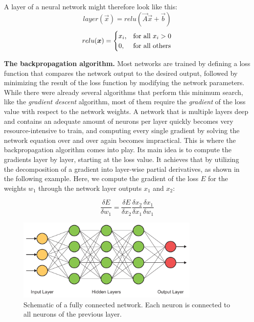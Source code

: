 A layer of a neural network might therefore look like this:
\begin{equation}\label{eq:networklayer}
layer(\vec{x}) = relu(\vec{A} \vec{x} + \vec{b})
\end{equation}
\begin{equation}
relu(\vec{x}) = \begin{cases}x_i$,$ & $for all $ x_i > 0\\0$,$ & $for all others$\end{cases}
\end{equation}


\textbf{The backpropagation algorithm.} Most networks are trained by defining a loss function that compares the network output to the desired output, followed by minimizing the result of the loss function by modifying the network parameters. While there were already several algorithms that perform this minimum search, like the \emph{gradient descent} algorithm, most of them require the \emph{gradient} of the loss value with respect to the network weights. A network that is multiple layers deep and contains an adequate amount of neurons per layer quickly becomes very resource-intensive to train, and computing every single gradient by solving the network equation over and over again becomes impractical. This is where the backpropagation algorithm comes into play. Its main idea is to compute the gradients layer by layer, starting at the loss value. It achieves that by utilizing the decomposition of a gradient into layer-wise partial derivatives, as shown in the following example. Here, we compute the gradient of the loss $E$ for the weights $w_1$ through the network layer outputs $x_1$ and $x_2$:

\begin{equation}
\frac{\delta E}{\delta w_1} = \frac{\delta E}{\delta x_2}\frac{\delta x_2}{\delta x_1}\frac{\delta x_1}{\delta w_1}
\end{equation}

\begin{figure}
  \centering
  \includegraphics[width=0.8\textwidth]{../assets/background/neural_network.pdf}
  \caption[Schematic of a fully connected network]{Schematic of a fully connected network. Each neuron is connected to all neurons of the previous layer.}
  \label{fig:neuralNetwork}
\end{figure}

